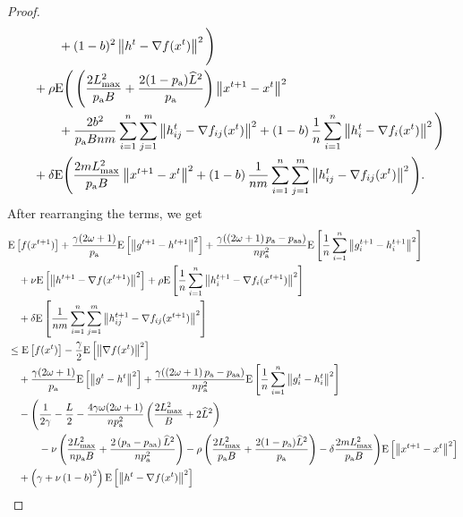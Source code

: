 \documentclass{article}
\newcommand*{\probavailable}{\ensuremath{p_{\textnormal{a}}}}
\newcommand*{\probpairaa}{\ensuremath{p_{\textnormal{aa}}}}
\begin{document}
\begin{proof}
\begin{align*}
      &\qquad\quad + (1 - b)^2\norm{h^{t} - \nabla f(x^{t})}^2\Bigg) \\
      &\quad + \rho {\rm E}\Bigg(\left(\frac{2 L_{\max}^2}{\probavailable B} +\frac{2(1 - \probavailable) \widehat{L}^2}{\probavailable}\right) \norm{x^{t+1} - x^{t}}^2 \\
      &\qquad\quad + \frac{2 b^2}{\probavailable B n m} \sum_{i=1}^n \sum_{j=1}^m\norm{h^t_{ij} - \nabla f_{ij}(x^{t})}^2 +\left(1 - b\right) \frac{1}{n} \sum_{i=1}^n \norm{h^{t}_i - \nabla f_i(x^{t})}^2\Bigg)\\
      &\quad + \delta {\rm E}\Bigg(\frac{2 m L_{\max}^2}{\probavailable B} \norm{x^{t+1} - x^{t}}^2 + \left(1 - b\right) \frac{1}{nm} \sum_{i=1}^n \sum_{j=1}^m \norm{h^t_{ij} - \nabla f_{ij}(x^{t})}^2\Bigg).
    \end{align*}
    After rearranging the terms, we get
    \begin{align*}
      &\Exp{f(x^{t + 1})} + \frac{\gamma (2 \omega + 1)}{\probavailable} \Exp{\norm{g^{t+1} - h^{t+1}}^2} + \frac{\gamma (\left(2 \omega + 1\right)\probavailable - \probpairaa)}{n \probavailable^2} \Exp{\frac{1}{n}\sum_{i=1}^n\norm{g^{t+1}_i - h^{t+1}_i}^2}\\
      &\quad  + \nu \Exp{\norm{h^{t+1} - \nabla f(x^{t+1})}^2} + \rho \Exp{\frac{1}{n}\sum_{i=1}^n\norm{h^{t+1}_i - \nabla f_i(x^{t+1})}^2}\\
      &\quad + \delta \Exp{\frac{1}{nm}\sum_{i=1}^n\sum_{j=1}^m\norm{h^{t+1}_{ij} - \nabla f_{ij}(x^{t+1})}^2} \\
      &\leq \Exp{f(x^t)} - \frac{\gamma}{2}\Exp{\norm{\nabla f(x^t)}^2} \\
      &\quad + \frac{\gamma (2 \omega + 1)}{\probavailable} \Exp{\norm{g^{t} - h^{t}}^2} + \frac{\gamma (\left(2 \omega + 1\right)\probavailable - \probpairaa)}{n \probavailable^2} \Exp{\frac{1}{n}\sum_{i=1}^n\norm{g^{t}_i - h^{t}_i}^2} \\
      &\quad - \Bigg(\frac{1}{2\gamma} - \frac{L}{2} - \frac{4 \gamma \omega (2 \omega + 1)}{n \probavailable^2} \left(\frac{2 L_{\max}^2}{B} + 2 \widehat{L}^2\right) \\
      &\qquad\quad - \nu\left(\frac{2 L_{\max}^2}{n \probavailable B} + \frac{2 \left(\probavailable - \probpairaa\right) \widehat{L}^2}{n \probavailable^2}\right) - \rho \left(\frac{2 L_{\max}^2}{\probavailable B} +\frac{2(1 - \probavailable) \widehat{L}^2}{\probavailable}\right) - \delta \frac{2 m L_{\max}^2}{\probavailable B} \Bigg) \Exp{\norm{x^{t+1} - x^t}^2} \\
      &\quad + \left(\gamma + \nu \left(1 - b\right)^2\right) \Exp{\norm{h^{t} - \nabla f(x^{t})}^2} \\

\end{align*}
\end{proof}
\end{document}
